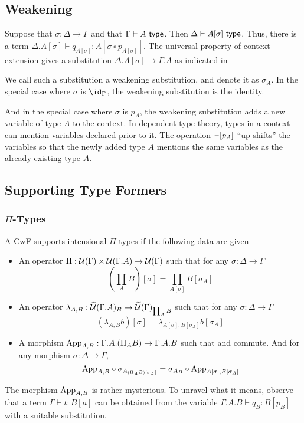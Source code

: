 \documentclass{amsart}
\begin{document}
\subsection{Weakening}
\label{sec:cwf-weakening}
Suppose that $\sigma : \Delta \to \Gamma$ and that $\Gamma \vdash A ~\mathsf{type}$.
Then $\Delta \vdash A[\sigma] ~\mathsf{type}$.
Thus, there is a term $\Delta.A[\sigma] \vdash q_{A[\sigma]} : A[\sigma \circ p_{A[\sigma]}]$.
The universal property of context extension gives a substitution $\Delta.A[\sigma] \to \Gamma.A$ as indicated in

We call such a substitution a weakening substitution, and denote it as $\sigma_{A}$.
In the special case where $\sigma$ is $\id_{\Gamma}$, the weakening substitution is the identity.

And in the special case where $\sigma$ is $p_{A}$, the weakening substitution adds a new variable of type $A$ to the context.
In dependent type theory, types in a context can mention variables declared prior to it.
The operation $\mathord{\hspace{1pt}\text{--}\hspace{1pt}}[p_{A}]$ ``up-shifts'' the variables so that the newly added type $A$ mentions the same variables as the already existing type $A$.


\subsection{Supporting Type Formers}
\label{sec:cwf-supporting-type-formers}

\subsubsection{$\Pi$-Types}
\label{sec:cwf-pi-types}

\begin{defn}
  A CwF supports intensional $\Pi$-types if the following data are given
  \begin{itemize}
  \item An operator $\Pi : \mathcal{U}(\Gamma) \times \mathcal{U}(\Gamma.A) \to \mathcal{U}(\Gamma)$ such that for any $\sigma : \Delta \to \Gamma$
    \[
      \left(\prod_{A}B\right)[\sigma] = \prod_{A[\sigma]}B[\sigma_{A}]
    \]
  \item An operator $\lambda_{A,B} : \widetilde{\mathcal{U}}(\Gamma.A)_{B} \to \widetilde{\mathcal{U}}(\Gamma)_{\prod_{A}B}$ such that for any $\sigma : \Delta \to \Gamma$
    \[
      (\lambda_{A,B}b)[\sigma] = \lambda_{A[\sigma],B[\sigma_{A}]}b[\sigma_{A}]
    \]
  \item A morphism $\mathrm{App}_{A,B} : \Gamma.A.(\Pi_{A}B) \to \Gamma.A.B$ such that  and  commute.
    And for any morphism $\sigma : \Delta \to \Gamma$,
    \[
      \mathrm{App}_{A,B} \circ \sigma_{A_{(\Pi_{A}B)[\sigma_{A}]}} = \sigma_{A_{B}} \circ \mathrm{App}_{A[\sigma],B[\sigma_{A}]}
    \]
  \end{itemize}
\end{defn}
The morphism $\mathrm{App}_{A,B}$ is rather mysterious.
To unravel what it means, observe that a term $\Gamma \vdash t : B[a]$ can be obtained from the variable $\Gamma.A.B \vdash q_{B} : B[p_{B}]$ with a suitable substitution.
\end{document}
